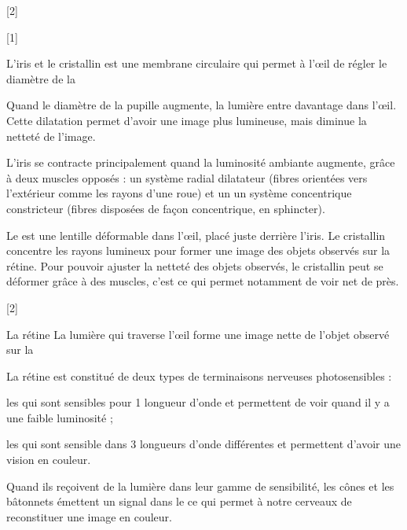 [2]

[1]


\begin{doc}{L'iris et le cristallin}
   est une membrane circulaire qui permet à l’œil de régler le diamètre de la  
  
  Quand le diamètre de la pupille augmente, la lumière entre davantage dans l’œil.
  Cette dilatation permet d'avoir une image plus lumineuse, mais diminue la netteté de l'image.

  L'iris se contracte principalement quand la luminosité ambiante augmente, grâce à deux muscles opposés : un système radial dilatateur (fibres orientées vers l'extérieur comme les rayons d'une roue) et un un système concentrique constricteur (fibres disposées de façon concentrique, en sphincter).

  Le  est une lentille déformable dans l'œil, placé juste derrière l'iris.
  Le cristallin concentre les rayons lumineux pour former une image des objets observés sur la rétine.
  Pour pouvoir ajuster la netteté des objets observés, le cristallin peut se déformer grâce à des muscles, c'est ce qui permet notamment de voir net de près.
\end{doc}

[2]


\begin{doc}{La rétine}
  La lumière qui traverse l’œil forme une image nette de l'objet observé sur la 
  
  La rétine est constitué de deux types de terminaisons nerveuses photosensibles :
  \begin{listePoints}
    \item les  qui sont sensibles pour 1 longueur d'onde et permettent de voir quand il y a une faible luminosité ;
    \item les  qui sont sensible dans 3 longueurs d'onde différentes et permettent d'avoir une vision en couleur.
  \end{listePoints}
  Quand ils reçoivent de la lumière dans leur gamme de sensibilité, les cônes et les bâtonnets émettent un signal dans le  ce qui permet à notre cerveaux de reconstituer une image en couleur.
\end{doc}

